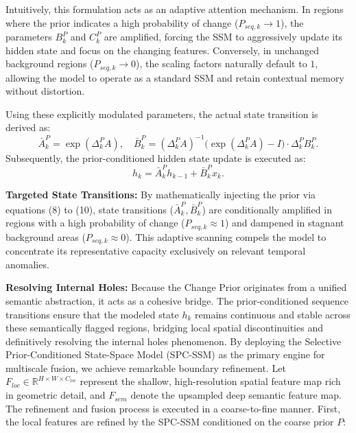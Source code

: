 \documentclass[10pt,conference]{IEEEtran}
\begin{document}
Intuitively, this formulation acts as an adaptive attention mechanism. In regions where the prior indicates a high probability of change ($P_{seq, k} \rightarrow 1$), the parameters $B_k^P$ and $C_k^P$ are amplified, forcing the SSM to aggressively update its hidden state and focus on the changing features. Conversely, in unchanged background regions ($P_{seq, k} \rightarrow 0$), the scaling factors naturally default to $1$, allowing the model to operate as a standard SSM and retain contextual memory without distortion.


Using these explicitly modulated parameters, the actual state transition is derived as:
\begin{equation}
    \bar{A}_k^P = \exp(\Delta_k^P A), \quad \bar{B}_k^P = (\Delta_k^P A)^{-1}\big(\exp(\Delta_k^P A) - I\big) \cdot \Delta_k^P B_k^P.
\end{equation}
Subsequently, the prior-conditioned hidden state update is executed as:
\begin{equation}
    h_k = \bar{A}_k^P h_{k-1} + \bar{B}_k^P x_k.
\end{equation}

\textbf{Targeted State Transitions:} By mathematically injecting the prior via equations (8) to (10), state transitions ($\bar{A}_k^P, \bar{B}_k^P$) are conditionally amplified in regions with a high probability of change ($P_{seq, k} \approx 1$) and dampened in stagnant background areas ($P_{seq, k} \approx 0$). This adaptive scanning compels the model to concentrate its representative capacity exclusively on relevant temporal anomalies.

\textbf{Resolving Internal Holes:} Because the Change Prior originates from a unified semantic abstraction, it acts as a cohesive bridge. The prior-conditioned sequence transitions ensure that the modeled state $h_k$ remains continuous and stable across these semantically flagged regions, bridging local spatial discontinuities and definitively resolving the internal holes phenomenon.
By deploying the Selective Prior-Conditioned State-Space Model (SPC-SSM) as the primary engine for multiscale fusion, we achieve remarkable boundary refinement. Let $F_{loc} \in \mathbb{R}^{H \times W \times C_{loc}}$ represent the shallow, high-resolution spatial feature map rich in geometric detail, and $F_{sem}$ denote the upsampled deep semantic feature map. The refinement and fusion process is executed in a coarse-to-fine manner. First, the local features are refined by the SPC-SSM conditioned on the coarse prior $P$:
\end{document}
